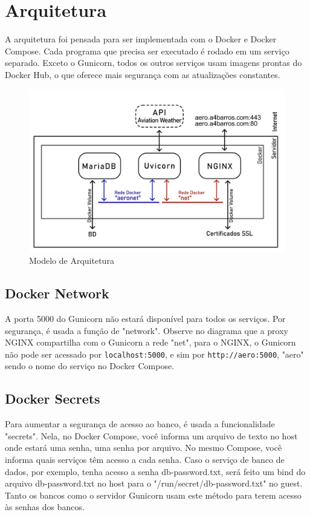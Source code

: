 \chapter{Arquitetura}

A arquitetura foi pensada para ser implementada com o Docker e Docker Compose. Cada
programa que precisa ser executado é rodado em um serviço separado. Exceto o Gunicorn,
todos os outros serviços usam imagens prontas do Docker Hub, o que oferece mais segurança
com as atualizações constantes.

\begin{figure}[ht]
    \begin{center}
    \includegraphics[width=\linewidth]{img/diagrama-arquitetura.png}
    \caption{Modelo de Arquitetura}
    \label{fig:arquitetura}
    \end{center}
\end{figure}

\section{Docker Network}
A porta 5000 do Gunicorn não estará disponível para todos os serviços. Por segurança, é usada a função de
"network". Observe no diagrama que a proxy NGINX compartilha com o Gunicorn a rede "net", para o NGINX,
o Gunicorn não pode ser acessado por \texttt{localhost:5000}, e sim por \texttt{http://aero:5000}, "aero"
sendo o nome do serviço no Docker Compose.


\section{Docker Secrets}

Para aumentar a segurança de acesso ao banco, é usada a funcionalidade "secrets". Nela, no Docker Compose,
você informa um arquivo de texto no host onde estará uma senha, uma senha por arquivo. No mesmo Compose,
você informa quais serviços têm acesso a cada senha. Caso o serviço de banco de dados, por exemplo, tenha
acesso a senha db-password.txt, será feito um bind do arquivo db-password.txt no host para o "/run/secret/db-password.txt"
no guest.
Tanto os bancos como o servidor Gunicorn usam este método para terem acesso às senhas dos bancos.

